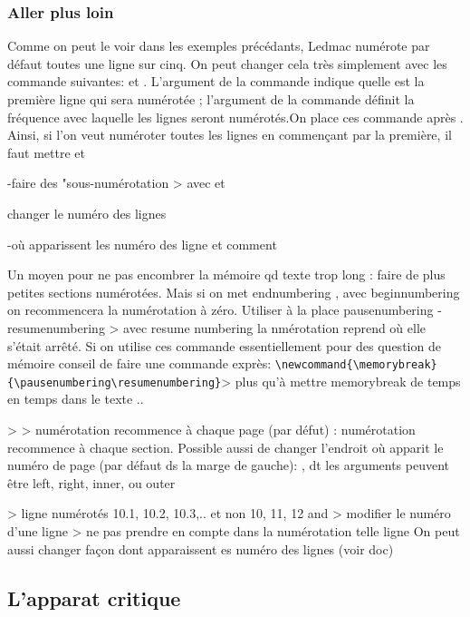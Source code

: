 \subsubsection{Aller plus loin}
Comme on peut le voir dans les exemples précédants, Ledmac numérote par défaut toutes une ligne sur cinq. On peut changer cela très simplement avec les commande suivantes:
 et .
L'argument  de la commande  indique quelle est  la première ligne qui sera numérotée ; l'argument  de la commande  définit la fréquence avec laquelle les lignes seront numérotés.On place ces commande après . Ainsi, si l'on veut numéroter toutes les lignes en commençant par la première, il faut mettre  et  




-faire des "sous-numérotation
> avec  
et 

changer le numéro des lignes

-où apparissent les numéro des ligne et comment

Un moyen pour ne pas encombrer la mémoire qd texte trop long : faire de plus petites sections numérotées. Mais si on met endnumbering ,  avec beginnumbering on recommencera la numérotation à zéro.  Utiliser à la place pausenumbering - resumenumbering > avec resume numbering la nmérotation reprend où elle s'était arrêté. Si on utilise ces commande essentiellement pour des question de mémoire conseil de faire une commande exprès: \verb|\newcommand{\memorybreak}{\pausenumbering\resumenumbering}|> plus qu'à mettre memorybreak de temps en temps dans le texte ..

 >  > numérotation recommence à chaque page  (par défut) : numérotation recommence à chaque section.
Possible aussi de changer l'endroit où apparit le numéro de page (par défaut ds la marge de gauche): , dt les arguments peuvent être left, right, inner, ou outer

  > ligne numérotés 10.1, 10.2, 10.3,.. et non 10, 11, 12 
 and  > modifier le numéro d'une ligne 
 > ne pas prendre en compte dans la numérotation telle ligne
On peut aussi changer façon dont apparaissent es numéro des lignes (voir doc)


\subsection{L'apparat critique}

